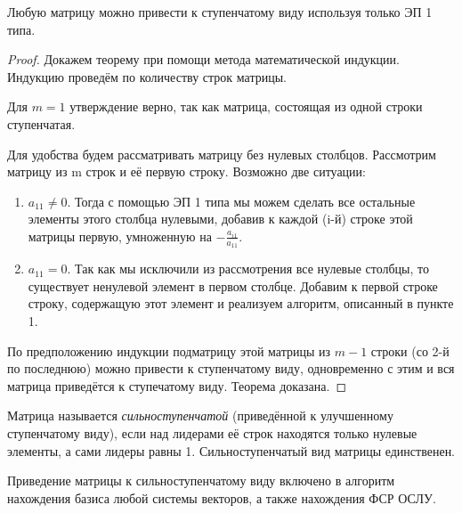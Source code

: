 \begin{theorem}
  Любую матрицу можно привести к ступенчатому виду используя только ЭП 1 типа.
  \label{mat:echelon}
\end{theorem}
  
\begin{proof}
  Докажем теорему при помощи метода математической индукции. Индукцию
  проведём по количеству строк матрицы.
  
  Для $m = 1$ утверждение верно, так как матрица, состоящая из одной строки ступенчатая.
    
  Для удобства будем рассматривать матрицу без нулевых
  столбцов. Рассмотрим матрицу из m строк и её первую строку. Возможно
  две ситуации:
  \begin{enumerate}
  \item $a_{11}\ne0$. Тогда с помощью ЭП 1 типа мы можем сделать все остальные элементы этого столбца нулевыми, добавив к каждой (i-й) строке этой матрицы первую, умноженную на $-\frac{a_{i1}}{a_{11}}$. 
  \item $a_{11}=0$. Так как мы исключили из рассмотрения все нулевые столбцы, то существует ненулевой элемент в первом столбце. Добавим к первой строке строку, содержащую этот элемент и реализуем алгоритм, описанный в пункте 1.
  \end{enumerate}
    
    По предположению индукции подматрицу этой матрицы из $m-1$ строки (со 2-й по последнюю) можно привести к ступенчатому виду, одновременно с этим и вся матрица приведётся к ступечатому виду. Теорема доказана.
  \end{proof}
  
  \begin{df}
    Матрица называется \emph{сильноступенчатой} (приведённой к улучшенному ступенчатому виду), если над лидерами её строк находятся только нулевые элементы, а сами лидеры равны 1. Сильноступенчатый вид матрицы единственен.
  \end{df}

Приведение матрицы к сильноступенчатому виду включено в алгоритм нахождения базиса любой системы векторов, а также нахождения ФСР ОСЛУ.
  
  
